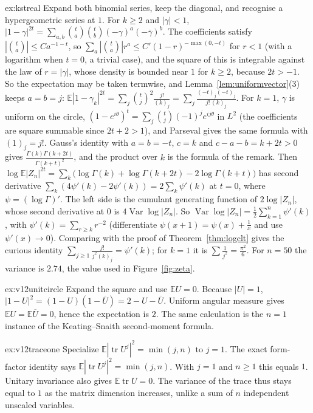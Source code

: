 \begin{solution}{ex:kstreal}
\idea Expand both binomial series, keep the diagonal, and recognise a hypergeometric series at $1$.
\writeup For $k\ge2$ and $|\gamma|<1$, $|1-\gamma|^{2t}=\sum_{a,b}\binom ta\binom tb(-\gamma)^a(-\bar\gamma)^b$. The coefficients satisfy $|\binom ta|\le Ca^{-1-t}$, so $\sum_a|\binom ta|r^a\le C'(1-r)^{-\max(0,-t)}$ for $r<1$ (with a logarithm when $t=0$, a trivial case),
and the square of this is integrable against the law of $r=|\gamma|$, whose density is bounded near $1$ for $k\ge2$, because $2t>-1$. So the expectation may be taken termwise, and Lemma~\ref{lem:uniformvector}(3) keeps $a=b=j$:
$\mathbb E|1-\gamma_k|^{2t}=\sum_j\binom tj^2\frac{j!}{(k)_j}=\sum_j\frac{(-t)_j(-t)_j}{j!\,(k)_j}$. For $k=1$, $\gamma$ is uniform on the circle, $(1-e^{i\theta})^t=\sum_j\binom tj(-1)^je^{ij\theta}$ in $L^2$ (the coefficients are square summable since $2t+2>1$), and
Parseval gives the same formula with $(1)_j=j!$. Gauss's identity with $a=b=-t$, $c=k$ and $c-a-b=k+2t>0$ gives $\frac{\Gamma(k)\Gamma(k+2t)}{\Gamma(k+t)^2}$, and the product over $k$ is the formula of the remark. Then
$\log\mathbb E|Z_n|^{2t}=\sum_k\bigl(\log\Gamma(k)+\log\Gamma(k+2t)-2\log\Gamma(k+t)\bigr)$ has second derivative $\sum_k(4\psi'(k)-2\psi'(k))=2\sum_k\psi'(k)$ at $t=0$, where $\psi=(\log\Gamma)'$. The left side is the cumulant generating function of
$2\log|Z_n|$, whose second derivative at $0$ is $4\operatorname{Var}\log|Z_n|$. So $\operatorname{Var}\log|Z_n|=\frac12\sum_{k=1}^n\psi'(k)$, with $\psi'(k)=\sum_{r\ge k}r^{-2}$ (differentiate $\psi(x+1)=\psi(x)+\frac1x$ and use $\psi'(x)\to0$). Comparing with the proof
of Theorem~\ref{thm:logclt} gives the curious identity $\sum_{j\ge1}\frac{j!}{j^2(k)_j}=\psi'(k)$; for $k=1$ it is $\sum\frac1{j^2}=\frac{\pi^2}6$. For $n=50$ the variance is $2.74$, the value used in Figure~\ref{fig:zeta}.
\end{solution}

\begin{solution}{ex:v12unitcircle}
\idea Expand the square and use $\mathbb EU=0$.
\writeup Because $|U|=1$, $|1-U|^2=(1-U)(1-\overline U)=2-U-\overline U$. Uniform angular measure gives $\mathbb EU=\mathbb E\overline U=0$, hence the expectation is $2$. The same calculation is the $n=1$ instance of the Keating--Snaith second-moment formula.
\end{solution}

\begin{solution}{ex:v12traceone}
\idea Specialize $\mathbb E|\operatorname{tr}U^j|^2=\min(j,n)$ to $j=1$.
\writeup The exact form-factor identity says $\mathbb E|\operatorname{tr}U^j|^2=\min(j,n)$. With $j=1$ and $n\ge1$ this equals $1$. Unitary invariance also gives $\mathbb E\operatorname{tr}U=0$. The variance of the trace thus stays equal to $1$ as the matrix dimension increases, unlike a sum of $n$ independent unscaled variables.
\end{solution}

